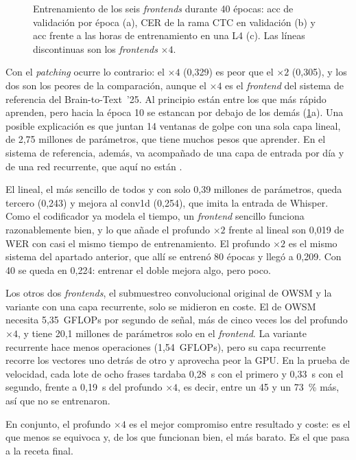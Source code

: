 \begin{figure}[htbp]
  \centering
  \caption[Entrenamiento de los \textit{frontends}]{Entrenamiento de los seis \textit{frontends} durante 40 épocas: acc de validación por época (a), CER de la rama CTC en validación (b) y acc frente a las horas de entrenamiento en una L4 (c). Las líneas discontinuas son los \textit{frontends} $\times 4$.}
  \label{fig:res-frontends-curvas}
\end{figure}

Con el \textit{patching} ocurre lo contrario: el $\times 4$ (0,329) es peor que el $\times 2$ (0,305), y los dos son los peores de la comparación, aunque el $\times 4$ es el \textit{frontend} del sistema de referencia del Brain-to-Text~'25. Al principio están entre los que más rápido aprenden, pero hacia la época 10 se estancan por debajo de los demás (\cref{fig:res-frontends-curvas}a). Una posible explicación es que juntan 14 ventanas de golpe con una sola capa lineal, de 2,75 millones de parámetros, que tiene muchos pesos que aprender. En el sistema de referencia, además, va acompañado de una capa de entrada por día y de una red recurrente, que aquí no están \cite{b2t25}.

El lineal, el más sencillo de todos y con solo 0,39 millones de parámetros, queda tercero (0,243) y mejora al conv1d (0,254), que imita la entrada de Whisper. Como el codificador ya modela el tiempo, un \textit{frontend} sencillo funciona razonablemente bien, y lo que añade el profundo $\times 2$ frente al lineal son 0,019 de WER con casi el mismo tiempo de entrenamiento. El profundo $\times 2$ es el mismo sistema del apartado anterior, que allí se entrenó 80 épocas y llegó a 0,209. Con 40 se queda en 0,224: entrenar el doble mejora algo, pero poco.

Los otros dos \textit{frontends}, el submuestreo convolucional original de OWSM y la variante con una capa recurrente, solo se midieron en coste. El de OWSM necesita 5,35~GFLOPs por segundo de señal, más de cinco veces los del profundo $\times 4$, y tiene 20,1 millones de parámetros solo en el \textit{frontend}. La variante recurrente hace menos operaciones (1,54~GFLOPs), pero su capa recurrente recorre los vectores uno detrás de otro y aprovecha peor la GPU. En la prueba de velocidad, cada lote de ocho frases tardaba 0,28~s con el primero y 0,33~s con el segundo, frente a 0,19~s del profundo $\times 4$, es decir, entre un 45 y un 73~\% más, así que no se entrenaron.

En conjunto, el profundo $\times 4$ es el mejor compromiso entre resultado y coste: es el que menos se equivoca y, de los que funcionan bien, el más barato. Es el que pasa a la receta final.

